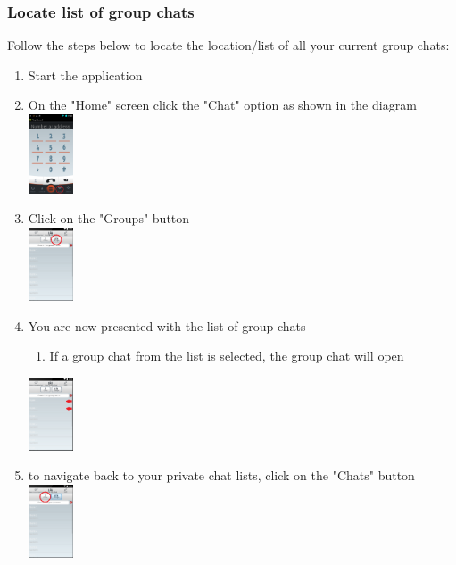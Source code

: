 \documentclass[11pt]{article}
\begin{document}
\subsubsection*{Locate list of group chats}
Follow the steps below to locate the location/list of all your current group chats:
\begin{enumerate}
\item Start the application
\item On the "Home" screen click the "Chat" option as shown in the diagram\\
\includegraphics[width=50px]{images/mainScreen.png}
\item Click on the "Groups" button\\
\includegraphics[width=50px]{images/ChatlistNav.png}
\item You are now presented with the list of group chats
\begin{enumerate}
\item If a group chat from the list is selected, the group chat will open\\
\end{enumerate}
\includegraphics[width=50px]{images/Grouplist.png}
\item to navigate back to your private chat lists, click on the "Chats" button\\
\includegraphics[width=50px]{images/GrouplistNav.png}
\end{enumerate}
\end{document}
